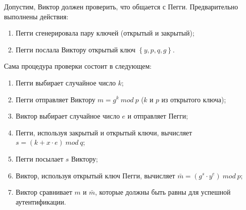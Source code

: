 Допустим, Виктор должен проверить, что общается с Пегги. Предварительно выполнены действия:

\begin{enumerate}
\item Пегги сгенерировала пару ключей (открытый и закрытый);
\item Пегги послала Виктору открытый ключ $\left\{y, p, q, g\right\}$.
\end{enumerate}


Сама процедура проверки состоит в следующем:

\begin{enumerate}
\item Пегги выбирает случайное число $k$;
\item Пегги отправляет Виктору $m = g ^ k \ mod \ p$ ($k$ и $p$ из открытого ключа);
\item Виктор выбирает случайное число $e$ и отправляет Пегги;
\item Пегги, используя закрытый и открытый ключи, вычисляет $s = (k + x \cdot e) \ mod \ q$;
\item Пегги посылает $s$ Виктору;
\item Виктор, используя открытый ключ Пегги, вычисляет $\bar{m} = (g^s \cdot y^e) \ mod \ p$;
\item Виктор сравнивает $m$ и $\bar{m}$, которые должны быть равны для успешной аутентификации.

\end{enumerate}